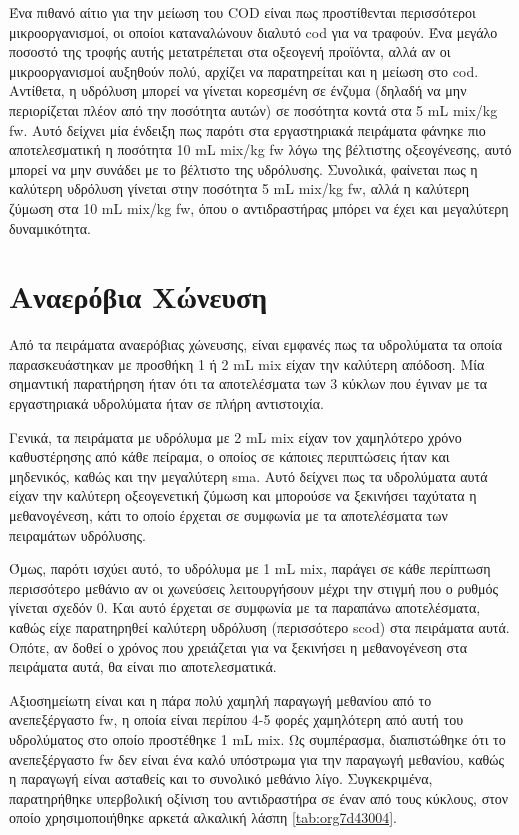 \documentclass[11pt]{report}
\begin{document}
Ένα πιθανό αίτιο για την μείωση του COD είναι πως προστίθενται περισσότεροι μικροοργανισμοί, οι οποίοι καταναλώνουν διαλυτό \acrshort{cod} για να τραφούν. Ένα μεγάλο ποσοστό της τροφής αυτής μετατρέπεται στα οξεογενή προϊόντα, αλλά αν οι μικροοργανισμοί αυξηθούν πολύ, αρχίζει να παρατηρείται και η μείωση στο \acrshort{cod}. Αντίθετα, η υδρόλυση μπορεί να γίνεται κορεσμένη σε ένζυμα (δηλαδή να μην περιορίζεται πλέον από την ποσότητα αυτών) σε ποσότητα κοντά στα 5 mL \acrshort{mix}/kg \acrshort{fw}. Αυτό δείχνει μία ένδειξη πως παρότι στα εργαστηριακά πειράματα φάνηκε πιο αποτελεσματική η ποσότητα 10 mL \acrshort{mix}/kg \acrshort{fw} λόγω της βέλτιστης οξεογένεσης, αυτό μπορεί να μην συνάδει με το βέλτιστο της υδρόλυσης. Συνολικά, φαίνεται πως η καλύτερη υδρόλυση γίνεται στην ποσότητα 5 mL \acrshort{mix}/kg \acrshort{fw}, αλλά η καλύτερη ζύμωση στα 10 mL \acrshort{mix}/kg \acrshort{fw}, όπου ο αντιδραστήρας μπόρει να έχει και μεγαλύτερη δυναμικότητα.

\section{Αναερόβια Χώνευση}
\label{sec:orge3d78f7}
Από τα πειράματα αναερόβιας χώνευσης, είναι εμφανές πως τα υδρολύματα τα οποία παρασκευάστηκαν με προσθήκη 1 ή 2 mL \acrshort{mix} είχαν την καλύτερη απόδοση. Μία σημαντική παρατήρηση ήταν ότι τα αποτελέσματα των 3 κύκλων που έγιναν με τα εργαστηριακά υδρολύματα ήταν σε πλήρη αντιστοιχία.

Γενικά, τα πειράματα με υδρόλυμα με 2 mL \acrshort{mix} είχαν τον χαμηλότερο χρόνο καθυστέρησης από κάθε πείραμα, ο οποίος σε κάποιες περιπτώσεις ήταν και μηδενικός, καθώς και την μεγαλύτερη \acrshort{sma}. Αυτό δείχνει πως τα υδρολύματα αυτά είχαν την καλύτερη οξεογενετική ζύμωση και μπορούσε να ξεκινήσει ταχύτατα η μεθανογένεση, κάτι το οποίο έρχεται σε συμφωνία με τα αποτελέσματα των πειραμάτων υδρόλυσης.

Όμως, παρότι ισχύει αυτό, το υδρόλυμα με 1 mL \acrshort{mix}, παράγει σε κάθε περίπτωση περισσότερο μεθάνιο αν οι χωνεύσεις λειτουργήσουν μέχρι την στιγμή που ο ρυθμός γίνεται σχεδόν 0. Και αυτό έρχεται σε συμφωνία με τα παραπάνω αποτελέσματα, καθώς είχε παρατηρηθεί καλύτερη υδρόλυση (περισσότερο \acrshort{scod}) στα πειράματα αυτά. Οπότε, αν δοθεί ο χρόνος που χρειάζεται για να ξεκινήσει η μεθανογένεση στα πειράματα αυτά, θα είναι πιο αποτελεσματικά.

Αξιοσημείωτη είναι και η πάρα πολύ χαμηλή παραγωγή μεθανίου από το ανεπεξέργαστο \acrshort{fw}, η οποία είναι περίπου 4-5 φορές χαμηλότερη από αυτή του υδρολύματος στο οποίο προστέθηκε 1 mL \acrshort{mix}. Ως συμπέρασμα, διαπιστώθηκε ότι το ανεπεξέργαστο \acrshort{fw} δεν είναι ένα καλό υπόστρωμα για την παραγωγή μεθανίου, καθώς η παραγωγή είναι ασταθείς και το συνολικό μεθάνιο λίγο. Συγκεκριμένα, παρατηρήθηκε υπερβολική οξίνιση του αντιδραστήρα σε έναν από τους κύκλους, στον οποίο χρησιμοποιήθηκε αρκετά αλκαλική λάσπη \ref{tab:org7d43004}.
\end{document}
